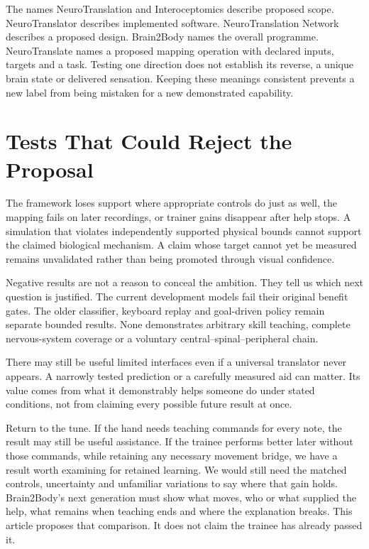 The names NeuroTranslation and Interoceptomics describe proposed scope. NeuroTranslator describes implemented software. NeuroTranslation Network describes a proposed design. Brain2Body names the overall programme. NeuroTranslate names a proposed mapping operation with declared inputs, targets and a task. Testing one direction does not establish its reverse, a unique brain state or delivered sensation. Keeping these meanings consistent prevents a new label from being mistaken for a new demonstrated capability.\par

\section{Tests That Could Reject the Proposal}

The framework loses support where appropriate controls do just as well, the mapping fails on later recordings, or trainer gains disappear after help stops. A simulation that violates independently supported physical bounds cannot support the claimed biological mechanism. A claim whose target cannot yet be measured remains unvalidated rather than being promoted through visual confidence.\par

Negative results are not a reason to conceal the ambition. They tell us which next question is justified. The current development models fail their original benefit gates. The older classifier, keyboard replay and goal-driven policy remain separate bounded results. None demonstrates arbitrary skill teaching, complete nervous-system coverage or a voluntary central--spinal--peripheral chain.\par

There may still be useful limited interfaces even if a universal translator never appears. A narrowly tested prediction or a carefully measured aid can matter. Its value comes from what it demonstrably helps someone do under stated conditions, not from claiming every possible future result at once.\par

Return to the tune. If the hand needs teaching commands for every note, the
result may still be useful assistance. If the trainee performs better later
without those commands, while retaining any necessary movement bridge, we
have a result worth examining for retained learning. We would still need the
matched controls, uncertainty and unfamiliar variations to say where that
gain holds. Brain2Body's next generation must show what moves, who or what
supplied the help, what remains when teaching ends and where the explanation
breaks. This article proposes that comparison. It does not claim the trainee
has already passed it.\par

